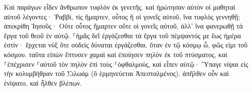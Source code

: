 \documentclass{openreader}
\begin{document}
Καὶ παράγων εἶδεν ἄνθρωπον τυφλὸν ἐκ γενετῆς. 
καὶ ἠρώτησαν αὐτὸν οἱ μαθηταὶ αὐτοῦ λέγοντες· Ῥαββί, τίς ἥμαρτεν, οὗτος ἢ οἱ γονεῖς αὐτοῦ, ἵνα τυφλὸς γεννηθῇ; 
ἀπεκρίθη Ἰησοῦς· Οὔτε οὗτος ἥμαρτεν οὔτε οἱ γονεῖς αὐτοῦ, ἀλλ’ ἵνα φανερωθῇ τὰ ἔργα τοῦ θεοῦ ἐν αὐτῷ. 
⸀ἡμᾶς δεῖ ἐργάζεσθαι τὰ ἔργα τοῦ πέμψαντός με ἕως ἡμέρα ἐστίν· ἔρχεται νὺξ ὅτε οὐδεὶς δύναται ἐργάζεσθαι. 
ὅταν ἐν τῷ κόσμῳ ὦ, φῶς εἰμι τοῦ κόσμου. 
ταῦτα εἰπὼν ἔπτυσεν χαμαὶ καὶ ἐποίησεν πηλὸν ἐκ τοῦ πτύσματος, καὶ ⸀ἐπέχρισεν ⸀αὐτοῦ τὸν πηλὸν ἐπὶ τοὺς ⸀ὀφθαλμούς, 
καὶ εἶπεν αὐτῷ· Ὕπαγε νίψαι εἰς τὴν κολυμβήθραν τοῦ Σιλωάμ (ὃ ἑρμηνεύεται Ἀπεσταλμένος). ἀπῆλθεν οὖν καὶ ἐνίψατο, καὶ ἦλθεν βλέπων. 
\end{document}
